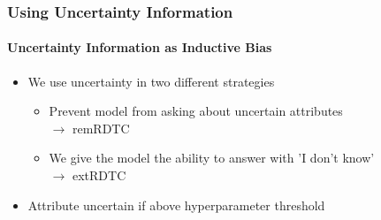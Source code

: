 \documentclass[9pt]{beamer}
\begin{document}
\begin{frame}	
\frametitle{Using Uncertainty Information}
\framesubtitle{Uncertainty Information as Inductive Bias}
\begin{itemize}
	\item We use uncertainty in two different strategies
	\begin{itemize}
		\item Prevent model from asking about uncertain attributes\\$\rightarrow$ remRDTC
		\item We give the model the ability to answer with 'I don't know'\\$\rightarrow$ extRDTC
	\end{itemize}
	\item Attribute uncertain if above hyperparameter threshold
\end{itemize}
\end{frame}
\end{document}
